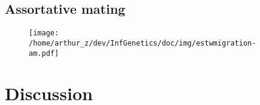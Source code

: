 \documentclass[11pt,a4paper]{article}
\begin{document}
\subsection*{Assortative mating}

\begin{figure}
\texttt{[image: /home/arthur\_z/dev/InfGenetics/doc/img/estwmigration-am.pdf]}
\caption{
\label{fig:}}
\end{figure}

\section*{Discussion}




\end{document}
